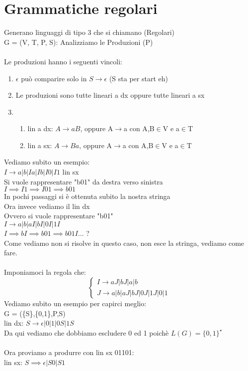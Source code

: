 \documentclass[12pt, a4paper, openany, oneside]{book}
\begin{document}
\section{Grammatiche regolari}
Generano linguaggi di tipo 3 che si chiamano (Regolari) \\
G = (V, T, P, S): Analizziamo le Produzioni (P)\\ \\
Le produzioni hanno i seguenti vincoli:
\begin{enumerate}
	\item $\epsilon$ può comparire solo in $S \to \epsilon$ (S sta per start eh)
	\item Le produzioni sono tutte lineari a dx oppure tutte lineari a sx
	\item \begin{enumerate}
	\item lin a dx: $A \to aB$, oppure A$\to$a con A,B$\in$V e a$\in$T
	\item lin a sx: $A \to Ba$, oppure A$\to$a con A,B$\in$V e a$\in$T
\end{enumerate}
\end{enumerate}
Vediamo subito un esempio:\\
$I \to a|b|Ia|Ib|I0|I1$ lin sx\\
Si vuole rappresentare "b01" da destra verso sinistra\\
$I \implies I1 \implies I01 \implies b01$ \\
In pochi passaggi si è ottenuta subito la nostra stringa \\
Ora invece vediamo il lin dx\\
Ovvero si vuole rappresentare "b01" \\
$I \to a|b|aI|bI|0I|1I$ \\
$I \implies bI \implies b01 \implies b01I ... $ ? \\
Come vediamo non si risolve in questo caso, non esce la stringa, vediamo come fare.
\\ \\
Imponiamoci la regola che:
\[\begin{cases}
I \to aJ|bJ|a|b \\
J \to a|b|aJ|bJ|0J|1J|0|1
\end{cases}\]
Vediamo subito un esempio per capirci meglio: \\
G = (\{S\},\{0,1\},P,S) \\
lin dx: $S \to \epsilon|0|1|0S|1S$ \\
Da qui vediamo che dobbiamo escludere 0 ed 1 poichè
$L(G) = \{0,1\}^{\star}$\\ \\
Ora proviamo a produrre con lin sx 01101: \\
lin sx: $S \implies \epsilon | S0 | S1$
\end{document}
